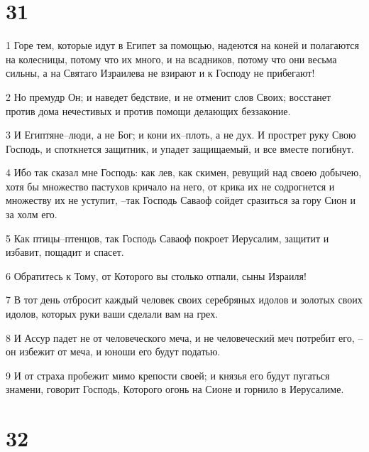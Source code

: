 \chapter{31}

\par 1 Горе тем, которые идут в Египет за помощью, надеются на коней и полагаются на колесницы, потому что их много, и на всадников, потому что они весьма сильны, а на Святаго Израилева не взирают и к Господу не прибегают!
\par 2 Но премудр Он; и наведет бедствие, и не отменит слов Своих; восстанет против дома нечестивых и против помощи делающих беззаконие.
\par 3 И Египтяне--люди, а не Бог; и кони их--плоть, а не дух. И прострет руку Свою Господь, и споткнется защитник, и упадет защищаемый, и все вместе погибнут.
\par 4 Ибо так сказал мне Господь: как лев, как скимен, ревущий над своею добычею, хотя бы множество пастухов кричало на него, от крика их не содрогнется и множеству их не уступит, --так Господь Саваоф сойдет сразиться за гору Сион и за холм его.
\par 5 Как птицы--птенцов, так Господь Саваоф покроет Иерусалим, защитит и избавит, пощадит и спасет.
\par 6 Обратитесь к Тому, от Которого вы столько отпали, сыны Израиля!
\par 7 В тот день отбросит каждый человек своих серебряных идолов и золотых своих идолов, которых руки ваши сделали вам на грех.
\par 8 И Ассур падет не от человеческого меча, и не человеческий меч потребит его, --он избежит от меча, и юноши его будут податью.
\par 9 И от страха пробежит мимо крепости своей; и князья его будут пугаться знамени, говорит Господь, Которого огонь на Сионе и горнило в Иерусалиме.

\chapter{32}

